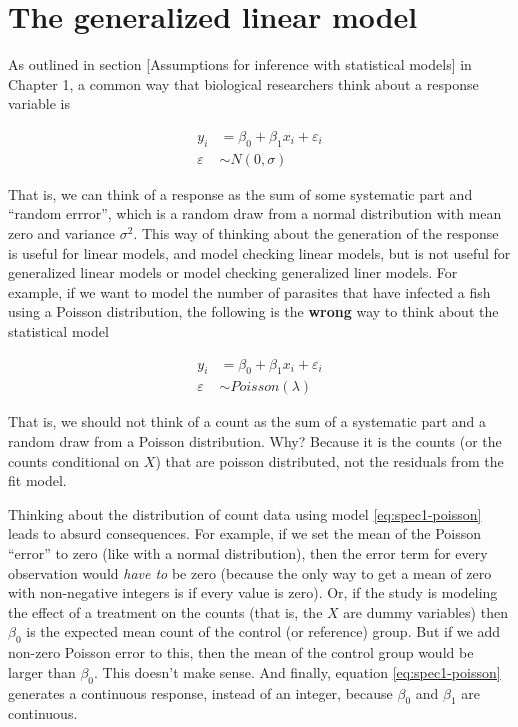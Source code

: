 \documentclass[]{book}
\begin{document}
\section{The generalized linear
model}\label{the-generalized-linear-model}

As outlined in section {[}Assumptions for inference with statistical
models{]} in Chapter 1, a common way that biological researchers think
about a response variable is

\begin{align}
y_i &= \beta_0 + \beta_1 x_i + \varepsilon_i \\
\varepsilon &\sim N(0, \sigma)
\label{eq:spec1}
\end{align}

That is, we can think of a response as the sum of some systematic part
and ``random errror'', which is a random draw from a normal distribution
with mean zero and variance \(\sigma^2\). This way of thinking about the
generation of the response is useful for linear models, and model
checking linear models, but is not useful for generalized linear models
or model checking generalized liner models. For example, if we want to
model the number of parasites that have infected a fish using a Poisson
distribution, the following is the \textbf{wrong} way to think about the
statistical model

\begin{align}
y_i &= \beta_0 + \beta_1 x_i + \varepsilon_i\\
\varepsilon &\sim Poisson(\lambda)
\label{eq:spec1-poisson}
\end{align}

That is, we should not think of a count as the sum of a systematic part
and a random draw from a Poisson distribution. Why? Because it is the
counts (or the counts conditional on \(X\)) that are poisson
distributed, not the residuals from the fit model.

Thinking about the distribution of count data using model
\eqref{eq:spec1-poisson} leads to absurd consequences. For example, if we
set the mean of the Poisson ``error'' to zero (like with a normal
distribution), then the error term for every observation would
\emph{have to} be zero (because the only way to get a mean of zero with
non-negative integers is if every value is zero). Or, if the study is
modeling the effect of a treatment on the counts (that is, the \(X\) are
dummy variables) then \(\beta_0\) is the expected mean count of the
control (or reference) group. But if we add non-zero Poisson error to
this, then the mean of the control group would be larger than
\(\beta_0\). This doesn't make sense. And finally, equation
\eqref{eq:spec1-poisson} generates a continuous response, instead of an
integer, because \(\beta_0\) and \(\beta_1\) are continuous.
\end{document}
